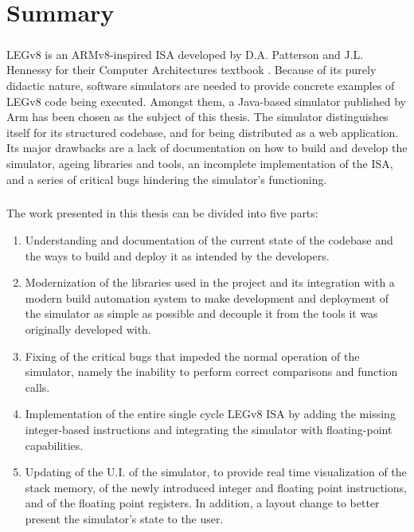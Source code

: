 \chapter{Summary}\label{chap:summ}
\paragraph{}
LEGv8 is an ARMv8-inspired ISA developed by D.A. Patterson and J.L. Hennessy for their Computer Architectures textbook \cite{patterson2016computer}. Because of its purely didactic nature, software simulators are needed to provide concrete examples of LEGv8 code being executed.
Amongst them, a Java-based simulator \cite{legv8simARMrepo} published by Arm \cite{armweb} has been chosen as the subject of this thesis. The simulator distinguishes itself for its structured codebase, and for being distributed as a web application. Its major drawbacks are a lack of documentation on how to build and develop the simulator, ageing libraries and tools, an incomplete implementation of the ISA, and a series of critical bugs hindering the simulator's functioning.

\paragraph{}
The work presented in this thesis can be divided into five parts:

\begin{enumerate}
    \item Understanding and documentation of the current state of the codebase and the ways to build and deploy it as intended by the developers.
    \item Modernization of the libraries used in the project and its integration with a modern build automation system \cite{mavenweb} to make development and deployment of the simulator as simple as possible and decouple it from the tools it was originally developed with.
    \item Fixing of the critical bugs that impeded the normal operation of the simulator, namely the inability to perform correct comparisons and function calls.
    \item Implementation of the entire single cycle LEGv8 ISA by adding the missing integer-based instructions and integrating the simulator with floating-point capabilities.
    \item Updating of the U.I. of the simulator, to provide real time visualization of the stack memory, of the newly introduced integer and floating point instructions, and of the floating point registers. In addition, a layout change to better present the simulator's state to the user.
\end{enumerate}


